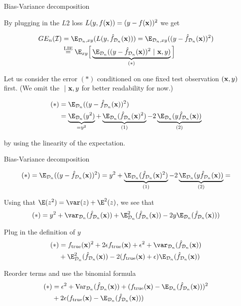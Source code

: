 \documentclass[11pt,compress,t,notes=noshow, xcolor=table]{beamer}
\begin{document}
\begin{framei}[sep=M]{Bias-Variance decomposition}

\item By plugging in the $L2$ loss $L(y, f(\mathbf{x})) = (y - f(\mathbf{x}))^2$ we get

{\footnotesize
\begin{align*}
GE_n(\ind) &= \E_{\D_n, xy}( L(y, \fh_{\D_n}(\xv))) = \E_{\D_n, xy}((y - \fh_{\D_n}(\xv))^2) \\
&\stackrel{\text{LIE}}{=} \E_{xy}\Big[\underbrace{\E_{\D_n}((y - \fh_{\D_n}(\xv))^2~|~ \xv, y)}_{(*)}\Big] 
\end{align*}
}

\item Let us consider the error $(*)$ conditioned on one fixed test observation $(\mathbf{x}, y)$ first. (We omit the $~|~\mathbf{x}, y$ for better readability for now.)

{\footnotesize
\begin{align*}
(*) &= \E_{\D_n}((y - \fh_{\D_n}(\xv))^2)\\
&= \underbrace{\E_{\D_n}(y^2)}_{= y^2} + \underbrace{\E_{\D_n}(\fh_{\D_n}(\xv)^2)}_{(1)}  - 2\underbrace{\E_{\D_n}(y\fh_{\D_n}(\xv))}_{(2)} 
\end{align*}
}

by using the linearity of the expectation.  %

\end{framei}
\begin{framei}[fs=small]{Bias-Variance decomposition}

\item $$
(*) = \E_{\D_n}((y - \fh_{\D_n}(\xv))^2) = 
y^2 + \underbrace{\E_{\D_n}(\fh_{\D_n}(\xv)^2)}_{(1)}  - 2\underbrace{\E_{\D_n}(y\fh_{\D_n}(\xv))}_{(2)} =
$$

\item Using that $\E(z^2) =\var(z) + \E^2(z)$, we see that
$$
(*) = y^2 + \var_{\D_n}(\fh_{\D_n}(\xv)) + \E^2_{\D_n}(\fh_{\D_n}(\xv)) - 2y \E_{\D_n}(\fh_{\D_n}(\xv)))
$$

\item Plug in the definition of $y$
\begin{align*}
(*) &= \ftrue(\xv)^2 +2\epsilon\ftrue(\xv) + \epsilon^2 + \var_{\D_n}(\fh_{\D_n}(\xv)) \\
& + \E^2_{\D_n}(\fh_{\D_n}(\xv)) - 2 (\ftrue(\xv)+\epsilon)\E_{\D_n}(\fh_{\D_n}(\xv))
\end{align*}

\item Reorder terms and use the binomial formula
\begin{align*}
(*) &= \epsilon^2 + \text{Var}_{\D_n}(\fh_{\D_n}(\xv)) + 
  (\ftrue(\xv) - \E_{\D_n}(\fh_{\D_n}(\xv)))^2\\
 &+ 2 \epsilon (\ftrue(\xv) - \E_{\D_n}(\fh_{\D_n}(\xv)))
\end{align*}

\end{framei}
\end{document}
